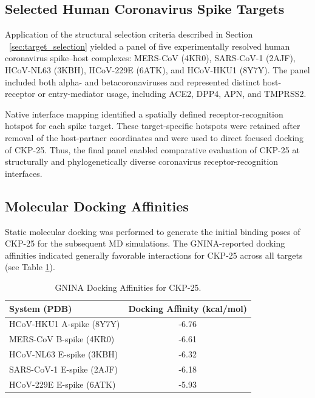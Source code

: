 \documentclass[pharmaceuticals,article,submit,pdftex,moreauthors]{Definitions/mdpi}
\begin{document}
\subsection{Selected Human Coronavirus Spike Targets}

Application of the structural selection criteria described in
Section ~\ref{sec:target_selection} yielded a panel of five experimentally
resolved human coronavirus spike--host complexes: MERS-CoV (4KR0),
SARS-CoV-1 (2AJF), HCoV-NL63 (3KBH), HCoV-229E (6ATK), and HCoV-HKU1
(8Y7Y). The panel included both alpha- and betacoronaviruses and
represented distinct host-receptor or entry-mediator usage, including
ACE2, DPP4, APN, and TMPRSS2.

Native interface mapping identified a spatially defined
receptor-recognition hotspot for each spike target. These target-specific
hotspots were retained after removal of the host-partner coordinates and
were used to direct focused docking of CKP-25. Thus, the final panel
enabled comparative evaluation of CKP-25 at structurally and
phylogenetically diverse coronavirus receptor-recognition interfaces.



\subsection{Molecular Docking Affinities}
Static molecular docking was performed to generate the initial binding poses of CKP-25 for the subsequent MD simulations. The GNINA-reported docking affinities indicated generally favorable interactions for CKP-25 across all targets (see Table \ref{affinity_scores}).

\begin{table}[H]
\caption{GNINA Docking Affinities for CKP-25.\label{affinity_scores}}
\centering
\begin{tabular}{lc}
\toprule
\textbf{System (PDB)} & \textbf{Docking Affinity (kcal/mol)} \\
\midrule
HCoV-HKU1 A-spike (8Y7Y)  & -6.76 \\
MERS-CoV B-spike (4KR0)   & -6.61 \\
HCoV-NL63 E-spike (3KBH)  & -6.32 \\
SARS-CoV-1 E-spike (2AJF) & -6.18 \\
HCoV-229E E-spike (6ATK)  & -5.93 \\
\bottomrule
\end{tabular}
\end{table}
\end{document}
